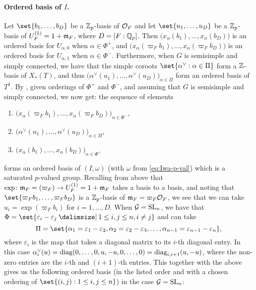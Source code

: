 \paragraph{Ordered basis of $I$.} Let $\set{b_{1},\dotsc,b_{D}}$ be a $\mathbb{Z}_{p}$-basis of $\mathcal{O}_{F}$ and let $\set{u_{1},\dotsc,u_{D}}$ be a $\mathbb{Z}_{p}$-basis of $U_{F}^{(1)} = 1+\mathfrak{m}_{F}$, where $D = [F:\mathbb{Q}_{p}]$. Then $\bigl( x_{\alpha}(b_{1}), \dotsc, x_{\alpha}(b_{D}) \bigr)$ is an ordered basis for $U_{\alpha,0}$ when $\alpha \in \Phi^{+}$, and $\bigl( x_{\alpha}(\varpi_{F}b_{1}), \dotsc, x_{\alpha}(\varpi_{F}b_{D}) \bigr)$ is an ordered basis for $U_{\alpha,1}$ when $\alpha \in \Phi^{-}$. Furthermore, when $G$ is semisimple and simply connected, we have that the simple coroots $\set{ \alpha^{\vee} : \alpha \in \Pi }$ form a $\mathbb{Z}$-basis of $X_{*}(T)$, and thus $\bigl( \alpha^{\vee}(u_{1}), \dotsc, \alpha^{\vee}(u_{D}) \bigr)_{\alpha \in \Pi}$ form an ordered basis of $T^{1}$. By \cite[Prop.~3.1]{IwaBasis}, given orderings of $\Phi^{+}$ and $\Phi^{-}$, and assuming that $G$ is semisimple and simply connected, we now get: the sequence of elements
\begin{enumerate}[$\bullet$]
  \item $\bigl( x_{\alpha}(\varpi_{F}b_{1}), \dotsc, x_{\alpha}(\varpi_{F}b_{D}) \bigr)_{\alpha \in \Phi^{-}}$,
  \item $\bigl( \alpha^{\vee}(u_{1}), \dotsc, \alpha^{\vee}(u_{D}) \bigr)_{\alpha \in \Pi}$,
  \item $\bigl( x_{\alpha}(b_{1}), \dotsc, x_{\alpha}(b_{D}) \bigr)_{\alpha \in \Phi^{+}}$
\end{enumerate}
forms an ordered basis of $(I,\omega)$ (with $\omega$ from \eqref{eq:Iwa-p-val}) which is a saturated $p$-valued group. Recalling from above that $\exp \colon \mathfrak{m}_{F} = (\varpi_{F}) \to U_{F}^{(1)} = 1 + \mathfrak{m}_{F}$ takes a basis to a basis, and noting that $\set{ \varpi_{F}b_{1}, \dotsc, \varpi_{F}b_{D} }$ is a $\mathbb{Z}_{p}$-basis of $\mathfrak{m}_{F} = \varpi_{F}\mathcal{O}_{F}$, we see that we can take $u_{i} = \exp(\varpi_{F}b_{i})$ for $i=1,\dotsc,D$. When $\mathcal{G} = \operatorname{SL}_{n}$, we have that $\Phi = \set{ \varepsilon_{i}-\varepsilon_{j} \given 1 \leq i,j \leq n, i\neq j }$ and can take
\begin{equation*}
  \Pi = \set{\alpha_{1}=\varepsilon_{1}-\varepsilon_{2}, \alpha_{2}=\varepsilon_{2}-\varepsilon_{3}, \dotsc, \alpha_{n-1}=\varepsilon_{n-1}-\varepsilon_{n}},
\end{equation*}
where $\varepsilon_{i}$ is the map that takes a diagonal matrix to its $i$-th diagonal entry. In this case $\alpha_{i}^{\vee}(u) = \operatorname{diag}(0,\dotsc,0,u,-u,0,\dotsc,0) = \operatorname{diag}_{i,i+1}(u,-u)$, where the non-zero entries are the $i$-th and $(i+1)$-th entries. This together with the above gives us the following ordered basis (in the listed order and with a chosen ordering of $\set{ (i,j) : 1 \leq i,j \leq n }$) in the case $\mathcal{G} = \operatorname{SL}_{n}$:
